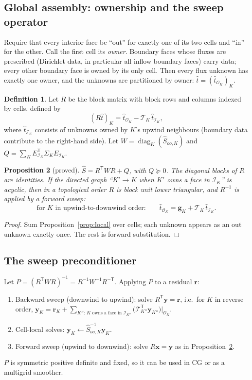 \documentclass[11pt]{article}
\newtheorem{proposition}{Proposition}
\theoremstyle{remark}
\theoremstyle{definition}
\newtheorem{definition}[proposition]{Definition}
\newcommand{\that}{\hat{t}}
\newcommand{\Shat}{\widehat{S}}
\newcommand{\T}{\mathsf{T}}
\newcommand{\Tr}{\mathcal{T}}
\DeclareMathOperator{\diag}{diag}
\begin{document}
\subsection{Global assembly: ownership and the sweep operator}

Require that every interior face be ``out'' for exactly one of its two cells and ``in'' for the other.  Call the first
cell its \emph{owner}.  Boundary faces whose fluxes are prescribed (Dirichlet data, in particular all inflow
boundary faces) carry data; every other boundary face is owned by its only cell.  Then
every flux unknown has exactly one owner, and the unknowns are partitioned by owner:
$\that = (\that_{\mathcal O_K})_K$.

\begin{definition}
Let $R$ be the block matrix with block rows and columns indexed by cells, defined by
\[
  (R\that)_K = \that_{\mathcal O_K} - \Tr_K\,\that_{\mathcal I_K},
\]
where $\that_{\mathcal I_K}$ consists of unknowns owned by $K$'s upwind neighbours (boundary data contribute to the
right-hand side).  Let $W=\diag_K(\Shat_{oo,K})$ and $Q=\sum_K E_{\mathcal I_K}^\T\Sigma_K E_{\mathcal I_K}$.
\end{definition}

\begin{proposition}[proved]\label{prop:global}
$\Shat = R^\T W R + Q$, with $Q\succeq0$.  The diagonal blocks of $R$ are identities.  If the directed graph ``$K'\to
K$ when $K'$ owns a face in $\mathcal I_K$'' is acyclic, then in a topological order $R$ is block unit
lower triangular, and $R^{-1}$ is applied by a forward sweep:
\[
  \text{for $K$ in upwind-to-downwind order:}\qquad \that_{\mathcal O_K} = \mathbf g_K + \Tr_K\,\that_{\mathcal I_K}.
\]
\end{proposition}
\begin{proof}
Sum Proposition~\ref{prop:local} over cells; each unknown appears as an out unknown exactly once.  The rest is
forward substitution.
\end{proof}

\subsection{The sweep preconditioner}

Let $P=(R^\T WR)^{-1} = R^{-1}W^{-1}R^{-\T}$.  Applying $P$ to a residual $\mathbf r$:
\begin{enumerate}[nosep]
  \item Backward sweep (downwind to upwind): solve $R^\T\mathbf y=\mathbf r$, i.e.\ for $K$ in reverse order,
        $\mathbf y_K = \mathbf r_K + \sum_{K'' :\,K\text{ owns a face in }\mathcal I_{K''}}
        \bigl(\Tr_{K''}^\T\mathbf y_{K''}\bigr)\big|_{\mathcal O_K}$.
  \item Cell-local solves: $\mathbf y_K\leftarrow\Shat_{oo,K}^{-1}\mathbf y_K$.
  \item Forward sweep (upwind to downwind): solve $R\mathbf x=\mathbf y$ as in Proposition~\ref{prop:global}.
\end{enumerate}
$P$ is symmetric positive definite and fixed, so it can be used in CG or as a multigrid smoother.
\end{document}

